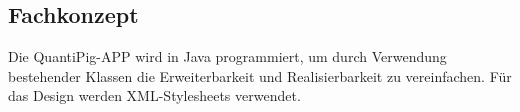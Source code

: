 \subsection{\textbf{Fachkonzept}}
Die \acs{QuantiPig}-APP  wird in Java programmiert, um durch Verwendung bestehender Klassen die Erweiterbarkeit und Realisierbarkeit zu vereinfachen. Für das Design werden \acs{XML}-Stylesheets verwendet.


%



